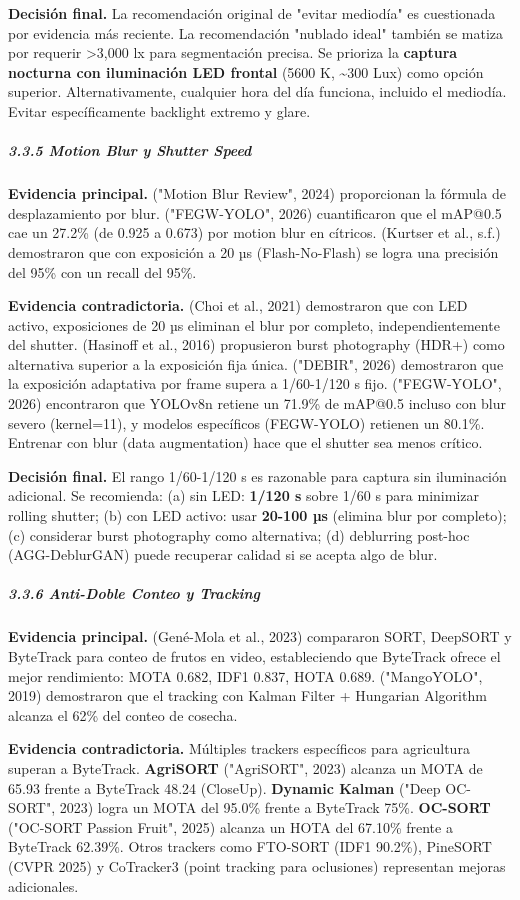 \textbf{Decisión final.} La recomendación original de "evitar mediodía" es cuestionada por evidencia más reciente. La recomendación "nublado ideal" también se matiza por requerir >3,000 lx para segmentación precisa. Se prioriza la \textbf{captura nocturna con iluminación LED frontal} (5600 K, \textasciitilde{}300 Lux) como opción superior. Alternativamente, cualquier hora del día funciona, incluido el mediodía. Evitar específicamente backlight extremo y glare.


\subparagraph{3.3.5 Motion Blur y Shutter Speed}


\textbf{Evidencia principal.} ("Motion Blur Review", 2024) proporcionan la fórmula de desplazamiento por blur. ("FEGW-YOLO", 2026) cuantificaron que el mAP@0.5 cae un 27.2\% (de 0.925 a 0.673) por motion blur en cítricos. (Kurtser et al., s.f.) demostraron que con exposición a 20 µs (Flash-No-Flash) se logra una precisión del 95\% con un recall del 95\%.


\textbf{Evidencia contradictoria.} (Choi et al., 2021) demostraron que con LED activo, exposiciones de 20 µs eliminan el blur por completo, independientemente del shutter. (Hasinoff et al., 2016) propusieron burst photography (HDR+) como alternativa superior a la exposición fija única. ("DEBIR", 2026) demostraron que la exposición adaptativa por frame supera a 1/60-1/120 s fijo. ("FEGW-YOLO", 2026) encontraron que YOLOv8n retiene un 71.9\% de mAP@0.5 incluso con blur severo (kernel=11), y modelos específicos (FEGW-YOLO) retienen un 80.1\%. Entrenar con blur (data augmentation) hace que el shutter sea menos crítico.


\textbf{Decisión final.} El rango 1/60-1/120 s es razonable para captura sin iluminación adicional. Se recomienda: (a) sin LED: \textbf{1/120 s} sobre 1/60 s para minimizar rolling shutter; (b) con LED activo: usar \textbf{20-100 µs} (elimina blur por completo); (c) considerar burst photography como alternativa; (d) deblurring post-hoc (AGG-DeblurGAN) puede recuperar calidad si se acepta algo de blur.


\subparagraph{3.3.6 Anti-Doble Conteo y Tracking}


\textbf{Evidencia principal.} (Gené-Mola et al., 2023) compararon SORT, DeepSORT y ByteTrack para conteo de frutos en video, estableciendo que ByteTrack ofrece el mejor rendimiento: MOTA 0.682, IDF1 0.837, HOTA 0.689. ("MangoYOLO", 2019) demostraron que el tracking con Kalman Filter + Hungarian Algorithm alcanza el 62\% del conteo de cosecha.


\textbf{Evidencia contradictoria.} Múltiples trackers específicos para agricultura superan a ByteTrack. \textbf{AgriSORT} ("AgriSORT", 2023) alcanza un MOTA de 65.93 frente a ByteTrack 48.24 (CloseUp). \textbf{Dynamic Kalman} ("Deep OC-SORT", 2023) logra un MOTA del 95.0\% frente a ByteTrack 75\%. \textbf{OC-SORT} ("OC-SORT Passion Fruit", 2025) alcanza un HOTA del 67.10\% frente a ByteTrack 62.39\%. Otros trackers como FTO-SORT (IDF1 90.2\%), PineSORT (CVPR 2025) y CoTracker3 (point tracking para oclusiones) representan mejoras adicionales.


